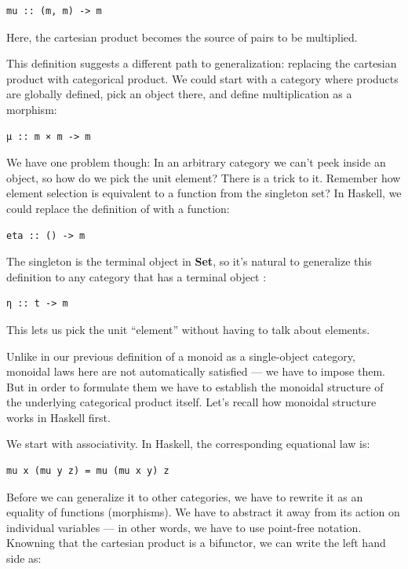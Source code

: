 \begin{Verbatim}[commandchars=\\\{\}]
mu :: (m, m) -> m
\end{Verbatim}
Here, the cartesian product  becomes the source of pairs
to be multiplied.

This definition suggests a different path to generalization: replacing
the cartesian product with categorical product. We could start with a
category where products are globally defined, pick an object 
there, and define multiplication as a morphism:

\begin{Verbatim}[commandchars=\\\{\}]
μ :: m × m -> m
\end{Verbatim}
We have one problem though: In an arbitrary category we can't peek
inside an object, so how do we pick the unit element? There is a trick
to it. Remember how element selection is equivalent to a function from
the singleton set? In Haskell, we could replace the definition of
 with a function:

\begin{Verbatim}[commandchars=\\\{\}]
eta :: () -> m
\end{Verbatim}
The singleton is the terminal object in \textbf{Set}, so it's natural to
generalize this definition to any category that has a terminal object
:

\begin{Verbatim}[commandchars=\\\{\}]
η :: t -> m
\end{Verbatim}
This lets us pick the unit ``element'' without having to talk about
elements.

Unlike in our previous definition of a monoid as a single-object
category, monoidal laws here are not automatically satisfied --- we have
to impose them. But in order to formulate them we have to establish the
monoidal structure of the underlying categorical product itself. Let's
recall how monoidal structure works in Haskell first.

We start with associativity. In Haskell, the corresponding equational
law is:

\begin{Verbatim}[commandchars=\\\{\}]
mu x (mu y z) = mu (mu x y) z
\end{Verbatim}
Before we can generalize it to other categories, we have to rewrite it
as an equality of functions (morphisms). We have to abstract it away
from its action on individual variables --- in other words, we have to
use point-free notation. Knowning that the cartesian product is a
bifunctor, we can write the left hand side as:

